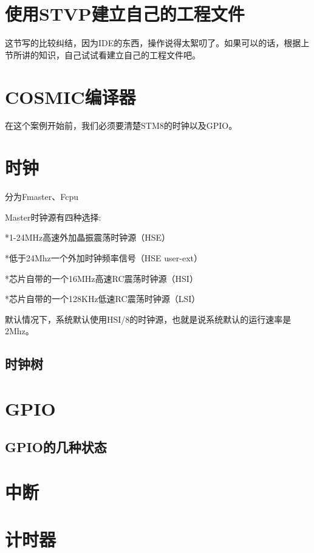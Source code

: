 \documentclass[a4paper]{book}
\begin{document}
\section{使用STVP建立自己的工程文件}

这节写的比较纠结，因为IDE的东西，操作说得太絮叨了。如果可以的话，根据上节所讲的知识，自己试试看建立自己的工程文件吧。

\section{COSMIC编译器}

在这个案例开始前，我们必须要清楚STM8的时钟以及GPIO。

\section{时钟}

分为Fmaster、Fcpu

Master时钟源有四种选择:

*1-24MHz高速外加晶振震荡时钟源（HSE）

*低于24Mhz一个外加时钟频率信号（HSE user-ext）

*芯片自带的一个16MHz高速RC震荡时钟源（HSI）

*芯片自带的一个128KHz低速RC震荡时钟源（LSI）

默认情况下，系统默认使用HSI/8的时钟源，也就是说系统默认的运行速率是2Mhz。

\subsection{时钟树}

\section{GPIO}

\subsection{GPIO的几种状态}

\section{中断}

\section{计时器}
\end{document}
